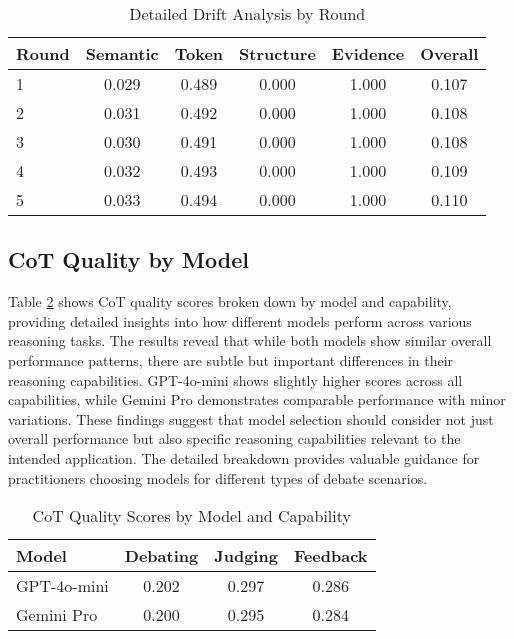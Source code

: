\documentclass[11pt]{article}
\begin{document}
\begin{table}[h]
\centering
\caption{Detailed Drift Analysis by Round}
\label{tab:detailed_drift}
\begin{tabular}{lccccc}
\toprule
Round & Semantic & Token & Structure & Evidence & Overall \\
\midrule
1 & 0.029 & 0.489 & 0.000 & 1.000 & 0.107 \\
2 & 0.031 & 0.492 & 0.000 & 1.000 & 0.108 \\
3 & 0.030 & 0.491 & 0.000 & 1.000 & 0.108 \\
4 & 0.032 & 0.493 & 0.000 & 1.000 & 0.109 \\
5 & 0.033 & 0.494 & 0.000 & 1.000 & 0.110 \\
\bottomrule
\end{tabular}
\end{table}

\subsection{CoT Quality by Model}

Table \ref{tab:cot_by_model} shows CoT quality scores broken down by model and capability, providing detailed insights into how different models perform across various reasoning tasks. The results reveal that while both models show similar overall performance patterns, there are subtle but important differences in their reasoning capabilities. GPT-4o-mini shows slightly higher scores across all capabilities, while Gemini Pro demonstrates comparable performance with minor variations. These findings suggest that model selection should consider not just overall performance but also specific reasoning capabilities relevant to the intended application. The detailed breakdown provides valuable guidance for practitioners choosing models for different types of debate scenarios.

\begin{table}[h]
\centering
\caption{CoT Quality Scores by Model and Capability}
\label{tab:cot_by_model}
\begin{tabular}{lccc}
\toprule
Model & Debating & Judging & Feedback \\
\midrule
GPT-4o-mini & 0.202 & 0.297 & 0.286 \\
Gemini Pro & 0.200 & 0.295 & 0.284 \\
\bottomrule
\end{tabular}
\end{table}

\newpage
\end{document}
